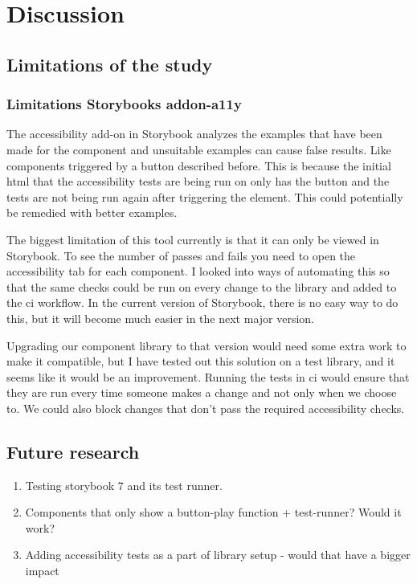\documentclass{master_thesis}
\begin{document}
\section{Discussion}

\subsection{Limitations of the study}
\subsubsection{Limitations Storybooks addon-a11y}

The accessibility add-on in Storybook analyzes the examples that have been made for the component and unsuitable examples can cause false results. Like components triggered by a button described before. This is because the initial \ac{html} that the accessibility tests are being run on only has the button and the tests are not being run again after triggering the element. This could potentially be remedied with better examples.

The biggest limitation of this tool currently is that it can only be viewed in Storybook. To see the number of passes and fails you need to open the accessibility tab for each component. I looked into ways of automating this so that the same checks could be run on every change to the library and added to the \ac{ci} workflow. In the current version of Storybook, there is no easy way to do this, but it will become much easier in the next major version.

Upgrading our component library to that version would need some extra work to make it compatible, but I have tested out this solution on a test library, and it seems like it would be an improvement. Running the tests in \ac{ci} would ensure that they are run every time someone makes a change and not only when we choose to. We could also block changes that don't pass the required accessibility checks.


\subsection{Future research}

\begin{enumerate}
	\item Testing storybook 7 and its test runner.
	\item Components that only show a button-play function + test-runner? Would it work?
	\item Adding accessibility tests as a part of library setup - would that have a bigger impact
\end{enumerate}

\end{document}
